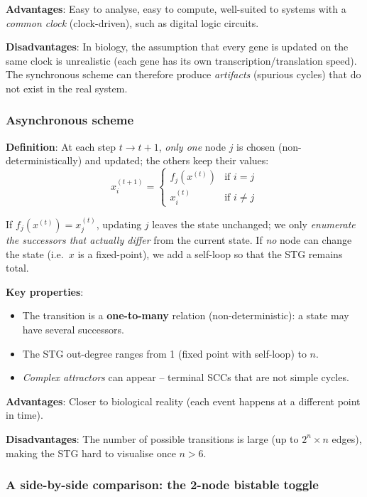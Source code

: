 \documentclass[oneside,final]{hcmut-report}
\begin{document}
\textbf{Advantages}: Easy to analyse, easy to compute, well-suited to systems with a \textit{common clock} (clock-driven), such as digital logic circuits.

\textbf{Disadvantages}: In biology, the assumption that every gene is updated on the same clock is unrealistic (each gene has its own transcription/translation speed). The synchronous scheme can therefore produce \textit{artifacts} (spurious cycles) that do not exist in the real system.

\subsubsection{Asynchronous scheme}

\textbf{Definition}: At each step $t \to t+1$, \textit{only one} node $j$ is chosen (non-deterministically) and updated; the others keep their values:
$$x_i^{(t+1)} = \begin{cases} f_j(x^{(t)}) & \text{if } i = j \\ x_i^{(t)} & \text{if } i \neq j \end{cases}$$

If $f_j(x^{(t)}) = x_j^{(t)}$, updating $j$ leaves the state unchanged; we only \textit{enumerate the successors that actually differ} from the current state. If \textit{no} node can change the state (i.e.\ $x$ is a fixed-point), we add a self-loop so that the STG remains total.

\textbf{Key properties}:
\begin{itemize}[leftmargin=*]
    \item The transition is a \textbf{one-to-many} relation (non-deterministic): a state may have several successors.
    \item The STG out-degree ranges from 1 (fixed point with self-loop) to $n$.
    \item \textit{Complex attractors} can appear -- terminal SCCs that are not simple cycles.
\end{itemize}

\textbf{Advantages}: Closer to biological reality (each event happens at a different point in time).

\textbf{Disadvantages}: The number of possible transitions is large (up to $2^n \times n$ edges), making the STG hard to visualise once $n > 6$.

\subsubsection{A side-by-side comparison: the 2-node bistable toggle}
\end{document}
